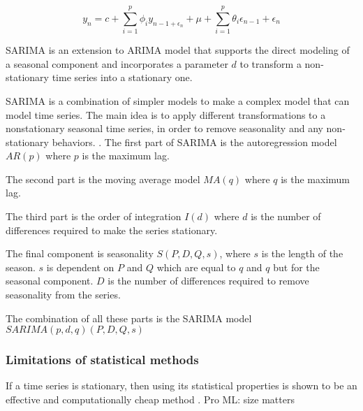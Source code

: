 \begin{equation}
    \label{eq:arma}
    y_n = c + \sum_{i=1}^{p} \phi_i y_{n-1 + \epsilon_n} + \mu + \sum_{i=1}^{p} \theta_i \epsilon_{n-1} + \epsilon_n
\end{equation}

SARIMA is an extension to ARIMA model that supports the direct modeling of a seasonal component and incorporates a parameter $d$
to transform a non-stationary time series into a stationary one.

SARIMA is a combination of simpler models to make a complex model that can model time series.
The main idea is to apply different transformations to a nonstationary seasonal time series,
in order to remove seasonality and any non-stationary behaviors.
\citet[p. 327-385]{Utlaut2008}.
The first part of SARIMA is the autoregression model
$AR(p)$ where $p$ is the maximum lag.

The second part is the moving average model $MA(q)$ where $q$ is the maximum lag.

The third part is the order of integration $I(d)$ where $d$ is the number of
differences required to make the series stationary.

The final component is seasonality $S(P, D, Q, s)$, where $s$ is the length
of the season.
$s$ is dependent on $P$ and $Q$ which are equal to $q$ and $q$ but for the seasonal component.
$D$ is the number of differences required to remove seasonality from the series.

The combination of all these parts is the SARIMA model $SARIMA(p, d, q)(P, D, Q, s)$

\subsubsection{Limitations of statistical methods}
If a time series is stationary, then using its statistical properties is shown to be an effective and computationally cheap method \cite{Makridakis2018}.
Pro ML: size matters \cite{Cerqueira2019}